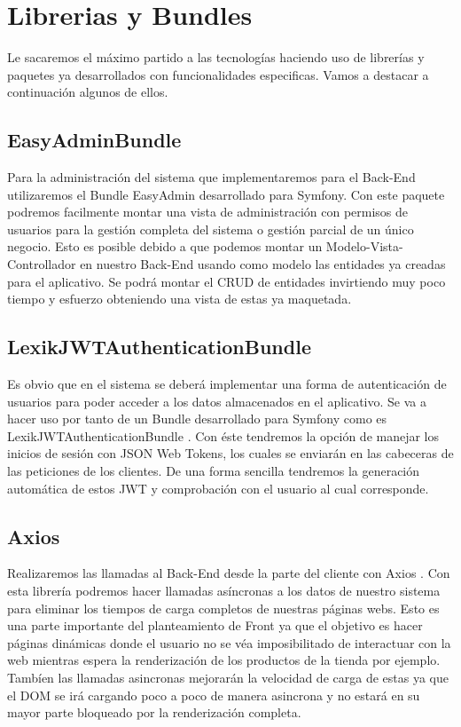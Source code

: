 \section{Librerias y Bundles}

Le sacaremos el máximo partido a las tecnologías haciendo uso de librerías y paquetes ya desarrollados con funcionalidades especificas. Vamos a destacar a continuación algunos de ellos.

\subsection{EasyAdminBundle}
Para la administración del sistema que implementaremos para el Back-End utilizaremos el Bundle EasyAdmin \cite{easyadmin} desarrollado para Symfony. Con este paquete podremos facilmente montar una vista de administración con permisos de usuarios para la gestión completa del sistema o gestión parcial de un único negocio. Esto es posible debido a que podemos montar un Modelo-Vista-Controllador en nuestro Back-End usando como modelo las entidades ya creadas para el aplicativo. Se podrá montar el CRUD de entidades invirtiendo muy poco tiempo y esfuerzo obteniendo una vista de estas ya maquetada.

\subsection{LexikJWTAuthenticationBundle}

Es obvio que en el sistema se deberá implementar una forma de autenticación de usuarios para poder acceder a los datos almacenados en el aplicativo. Se va a hacer uso por tanto de un Bundle desarrollado para Symfony como es LexikJWTAuthenticationBundle \cite{jwt}. Con éste tendremos la opción de manejar los inicios de sesión con JSON Web Tokens, los cuales se enviarán en las cabeceras de las peticiones de los clientes. De una forma sencilla tendremos la generación automática de estos JWT y comprobación con el usuario al cual corresponde.

\subsection{Axios} 

Realizaremos las llamadas al Back-End desde la parte del cliente con Axios \cite{axios}. Con esta librería podremos hacer llamadas asíncronas a los datos de nuestro sistema para eliminar los tiempos de carga completos de nuestras páginas webs. Esto es una parte importante del planteamiento de Front ya que el objetivo es hacer páginas dinámicas donde el usuario no se véa imposibilitado de interactuar con la web mientras espera la renderización de los productos de la tienda por ejemplo. Tambíen las llamadas asincronas mejorarán la velocidad de carga de estas ya que el DOM se irá cargando poco a poco de manera asincrona y no estará en su mayor parte bloqueado por la renderización completa. 

